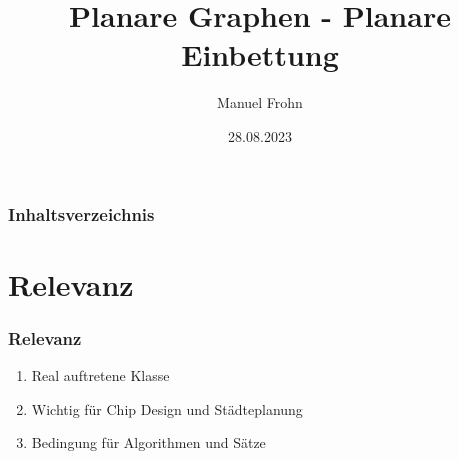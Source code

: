 \documentclass{beamer}
\author{Manuel Frohn}
\title{Planare Graphen - Planare Einbettung}
\institute{RWTH Aachen University, Aachen, Germany}
\date{28.08.2023}
\begin{document}
    \begin{frame}
        \maketitle
    \end{frame}

    \begin{frame}
        \frametitle{Inhaltsverzeichnis}
        \tableofcontents
    \end{frame}

    \section{Relevanz}
    \begin{frame}
        \frametitle{Relevanz}
        \begin{enumerate}
            \item Real auftretene Klasse
            \item Wichtig für Chip Design und Städteplanung
            \item Bedingung für Algorithmen und Sätze
        \end{enumerate}
    \end{frame}



\end{document}

